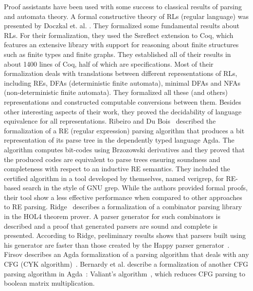 Proof assistants have been used with some success to classical results of parsing and automata theory.
A formal constructive theory of RLs (regular language) was presented by Doczkal et. al.
\cite{Doczkal13}. They formalized some fundamental results about RLs.
For their formalization, they used the Ssreflect extension to Coq, which
features an extensive library with support for reasoning about finite
structures such as finite types and finite graphs. They established all
of their results in about 1400 lines of Coq, half of which are specifications.
Most of their formalization deals with translations between different
representations of RLs, including REs, DFAs (deterministic finite automata),
minimal DFAs and NFAs (non-deterministic finite automata).
They formalized all these (and others) representations and constructed
computable conversions between them. Besides other interesting aspects
of their work, they proved the decidability of language equivalence
for all representations. Ribeiro and Du Bois~\cite{Ribeiro17} described the formalization of a RE
(regular expression) parsing algorithm that produces a bit representation
of its parse tree in the dependently typed language Agda. The algorithm computes bit-codes using Brzozowski derivatives and
they proved that the produced codes are equivalent to parse trees ensuring soundness and completeness with respect to an
inductive RE semantics. They included the certified algorithm in a tool developed by themselves, named verigrep, for RE-based
search in the style of GNU grep. While the authors provided formal proofs, their tool show a less effective performance when compared to
other approaches to RE parsing. Ridge~\cite{Ridge2011} describes a formalization of a combinator parsing library  in the HOL4 theorem
prover. A parser generator for such
combinators is described and a proof that generated parsers are sound
and complete is presented.  According to Ridge, preliminary results
shows that parsers built using his generator are faster than those
created by the Happy parser generator~\cite{Happy}.
Firsov describes an Agda formalization of a parsing algorithm that
deals with any CFG (CYK algorithm)~\cite{Firsov2014}. Bernardy
et al. describe a formalization of another CFG parsing algorithm in
Agda~\cite{BernardyJ16}: Valiant's algorithm~\cite{Valiant1975}, which
reduces CFG parsing to boolean matrix multiplication. 


